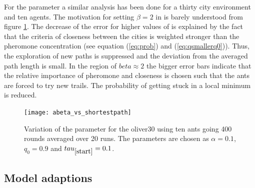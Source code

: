 For the parameter \beta a similar analysis has been done for a thirty city environment and ten agents. The motivation for setting $\beta=2$ in \cite{paper} is barely understood from figure \ref{fig:betasp}. The decrease of the error for higher values of \beta is explained by the fact that the criteria of closeness between the cities is weighted stronger than the pheromone concentration (see equation (\ref{eq:prob}) and (\ref{eq:qsmallerq0})). Thus, the exploration of new paths is suppressed and the deviation from the averaged path length is small. In the region of $beta\approx2$ the bigger error bars indicate that the relative importance of pheromone and closeness is chosen such that the ants are forced to try new trails. The probability of getting stuck in a local minimum is reduced.
\begin{figure}[h!]
\begin{center}
\texttt{[image: abeta\_vs\_shortestpath]}
\caption{Variation of the parameter \beta for the oliver30 using ten ants going 400 rounds averaged over 20 runs. The parameters are chosen as $\alpha=0.1$,$q_0=0.9$ and $tau_{\ref{start}}=0.1$.}
\label{fig:betasp}
\end{center}
\end{figure}



\subsection{Model adaptions}

